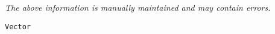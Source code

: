 \label{pkg:vector}

{\tiny \it The above information is manually maintained and may contain errors.}
\begin{verbatim}
Vector
\end{verbatim}
